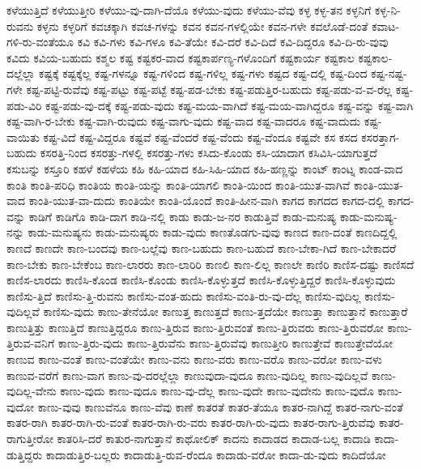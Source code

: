 {ಕಳೆಯುತ್ತಿದೆ
ಕಳೆಯುತ್ತೀರಿ
ಕಳೆಯು-ವು-ದಾಗಿ-ದೆಯೊ
ಕಳೆಯು-ವುದು
ಕಳೆಯು-ವೆವು
ಕಳ್ಳ
ಕಳ್ಳ-ತನ
ಕಳ್ಳನಿಗೆ
ಕಳ್ಳ-ನಿ-ರುವನು
ಕಳ್ಳನು
ಕಳ್ಳರಿಗೆ
ಕವಚಕ್ಕಾಗಿ
ಕವಚ-ಗಳನ್ನು
ಕವನ
ಕವನ-ಗಳಲ್ಲಿಯೇ
ಕವನ-ಗಳೇ
ಕವಲೊಡೆ-ದಂತೆ
ಕವಾಟ-ಗಳಿ-ರು-ವಂತೆಯೂ
ಕವಿ
ಕವಿ-ಗಳು
ಕವಿ-ಗಳೂ
ಕವಿ-ತೆಯೇ
ಕವಿ-ದರೆ
ಕವಿ-ದಿದೆ
ಕವಿ-ದಿದ್ದರೂ
ಕವಿ-ದಿ-ರು-ವುವು
ಕವಿದು
ಕವಿಯ-ಬಹುದು
ಕಶ್ಮಲ
ಕಷ್ಟ
ಕಷ್ಟಕರ-ವಾದ
ಕಷ್ಟಕಾರ್ಪಣ್ಯ-ಗಳೊಂದಿಗೆ
ಕಷ್ಟಕಾರ್ಯ
ಕಷ್ಟಕಾಲ
ಕಷ್ಟಕಾಲ-ದಲ್ಲೆಲ್ಲಾ
ಕಷ್ಟಕ್ಕೆ
ಕಷ್ಟಕ್ಕೆಲ್ಲ
ಕಷ್ಟ-ಗಳನ್ನೂ
ಕಷ್ಟ-ಗಳಿಂದ
ಕಷ್ಟ-ಗಳಿಲ್ಲ
ಕಷ್ಟ-ಗಳು
ಕಷ್ಟದ
ಕಷ್ಟ-ದಲ್ಲಿ
ಕಷ್ಟ-ದಿಂದ
ಕಷ್ಟ-ನಷ್ಟ-ಗಳೇ
ಕಷ್ಟ-ಪಟ್ಟಿ-ರುವೆವು
ಕಷ್ಟ-ಪಟ್ಟು
ಕಷ್ಟ-ಪಟ್ಟೆ
ಕಷ್ಟ-ಪಡ-ಬೇಕು
ಕಷ್ಟ-ಪಡುತ್ತಿರ-ಬಹುದು
ಕಷ್ಟ-ಪಡು-ವ-ವ-ರೆಲ್ಲ
ಕಷ್ಟ-ಪಡು-ವಿರಿ
ಕಷ್ಟ-ಪಡು-ವು-ದಕ್ಕೆ
ಕಷ್ಟ-ಪಡು-ವುದು
ಕಷ್ಟ-ಮಯ-ವಾಗಿದೆ
ಕಷ್ಟ-ಮಯ-ವಾಗಿದ್ದರೂ
ಕಷ್ಟ-ವನ್ನು
ಕಷ್ಟ-ವಾಗಿ
ಕಷ್ಟ-ವಾಗಿ-ರ-ಬೇಕು
ಕಷ್ಟ-ವಾಗಿ-ರುವುದು
ಕಷ್ಟ-ವಾಗು-ವುದು
ಕಷ್ಟ-ವಾದ
ಕಷ್ಟ-ವಾದರೂ
ಕಷ್ಟ-ವಾದುದು
ಕಷ್ಟ-ವಾಯಿತು
ಕಷ್ಟ-ವಿದೆ
ಕಷ್ಟ-ವಿದ್ದರೂ
ಕಷ್ಟವೆ
ಕಷ್ಟ-ವೆಂದರೆ
ಕಷ್ಟ-ವೆಂದು
ಕಷ್ಟ-ವೆಂದೂ
ಕಷ್ಟವೇ
ಕಸ
ಕಸದ
ಕಸರತ್ತಾಗ-ಬಹುದು
ಕಸರತ್ತಿ-ನಿಂದ
ಕಸರತ್ತು-ಗಳಲ್ಲಿ
ಕಸರತ್ತು-ಗಳು
ಕಸಿದು-ಕೊಂಡು
ಕಸಿ-ಯಾದಾಗ
ಕಸಿವಿಸಿ-ಯಾಗುತ್ತದೆ
ಕಸುಬನ್ನು
ಕಸ್ತೂರಿ
ಕಹಳೆ
ಕಹಳೆಯ
ಕಹಿ
ಕಹಿ-ಯಾದ
ಕಹಿ-ಸಿಹಿ-ಯಾದ
ಕಹಿ-ಹಣ್ಣನ್ನು
ಕಾಂಟ್
ಕಾಂಟ್ನ
ಕಾಂಡ-ವಾದ
ಕಾಂತಿ
ಕಾಂತಿ-ಪರಿಧಿ
ಕಾಂತಿಯ
ಕಾಂತಿ-ಯನ್ನು
ಕಾಂತಿ-ಯಾಗಲಿ
ಕಾಂತಿ-ಯಿಂದ
ಕಾಂತಿ-ಯುತ-ವಾಗಿವೆ
ಕಾಂತಿ-ಯುತ-ವಾದ
ಕಾಂತಿ-ಯುತ-ವಾ-ದುದು
ಕಾಂತಿಯೇ
ಕಾಂತಿ-ಯೊಂದೆ
ಕಾಂತಿ-ಹೀನ-ವಾಗಿ
ಕಾಗದ
ಕಾಗದದ
ಕಾಗದ-ದಲ್ಲಿ
ಕಾಗದ-ವನ್ನು
ಕಾಡಿಗೆ
ಕಾಡಿಗೊ
ಕಾಡಿ-ದಾಗ
ಕಾಡಿ-ನಲ್ಲಿ
ಕಾಡು
ಕಾಡು-ಜ-ನರ
ಕಾಡುತ್ತಿವೆ
ಕಾಡು-ಮನುಷ್ಯ
ಕಾಡು-ಮನುಷ್ಯ-ನನ್ನು
ಕಾಡು-ಮನುಷ್ಯನು
ಕಾಡು-ಮನುಷ್ಯರು
ಕಾಡು-ವುದು
ಕಾಣತೊಡಗು-ವುವು
ಕಾಣದ
ಕಾಣ-ದಂತೆ
ಕಾಣದಿದ್ದಲ್ಲಿ
ಕಾಣದೆ
ಕಾಣದೇ
ಕಾಣ-ಬಂದವು
ಕಾಣ-ಬಲ್ಲೆವು
ಕಾಣ-ಬಹುದು
ಕಾಣ-ಬಹುದೆ
ಕಾಣ-ಬೇಕಾ-ಗಿದೆ
ಕಾಣ-ಬೇಕಾದರೆ
ಕಾಣ-ಬೇಕು
ಕಾಣ-ಬೇಕೆಂಬ
ಕಾಣ-ಲಾರರು
ಕಾಣ-ಲಾರಿರಿ
ಕಾಣಲಿ
ಕಾಣ-ಲಿಲ್ಲ
ಕಾಣಲೇ
ಕಾಣಿರಿ
ಕಾಣಿಸ-ದಷ್ಟು
ಕಾಣಿಸದೆ
ಕಾಣಿಸ-ಲಾರದು
ಕಾಣಿಸಿ-ಕೊಂಡ
ಕಾಣಿಸಿ-ಕೊಂಡು
ಕಾಣಿಸಿ-ಕೊಳ್ಳುತ್ತದೆ
ಕಾಣಿಸಿ-ಕೊಳ್ಳುತ್ತಿದ್ದರೆ
ಕಾಣಿಸಿ-ಕೊಳ್ಳುವುದು
ಕಾಣಿಸು-ತ್ತಿದೆ
ಕಾಣಿಸು-ತ್ತಿ-ರುವನು
ಕಾಣಿಸು-ವಂತ-ಹುದು
ಕಾಣಿಸು-ವಂತಿ-ರು-ವು-ದೆಲ್ಲ
ಕಾಣಿಸು-ವುದಿಲ್ಲ
ಕಾಣಿಸು-ವುದಿಲ್ಲವೆ
ಕಾಣಿಸು-ವುದು
ಕಾಣು-ತೇನೆಯೋ
ಕಾಣುತ್ತ
ಕಾಣುತ್ತದೆ
ಕಾಣು-ತ್ತದೆಯೇ
ಕಾಣುತ್ತಾ
ಕಾಣುತ್ತಾನೆ
ಕಾಣುತ್ತಾರೆ
ಕಾಣುತ್ತಿತ್ತು
ಕಾಣುತ್ತಿದೆ
ಕಾಣುತ್ತಿದ್ದರೂ
ಕಾಣು-ತ್ತಿರುವ
ಕಾಣು-ತ್ತಿರುವಂತೆ
ಕಾಣು-ತ್ತಿರುವರು
ಕಾಣು-ತ್ತಿರುವರೋ
ಕಾಣು-ತ್ತಿರುವ-ವನಿಗೆ
ಕಾಣು-ತ್ತಿರು-ವುದು
ಕಾಣು-ತ್ತಿರುವೆನು
ಕಾಣು-ತ್ತಿರುವೆವು
ಕಾಣುತ್ತೀರಿ
ಕಾಣುತ್ತೇವೆ
ಕಾಣುತ್ತೇವೆಯೋ
ಕಾಣುವ
ಕಾಣು-ವಂತೆ
ಕಾಣು-ವಂತೆಯೇ
ಕಾಣು-ವನು
ಕಾಣು-ವರು
ಕಾಣು-ವರೊ
ಕಾಣು-ವರೋ
ಕಾಣು-ವಳು
ಕಾಣುವ-ವರೆಗೆ
ಕಾಣು-ವಾಗ
ಕಾಣು-ವು-ದರಲ್ಲೆಲ್ಲಾ
ಕಾಣುವುದಾ-ವುದೂ
ಕಾಣು-ವುದಿಲ್ಲ
ಕಾಣು-ವುದಿಲ್ಲವೆ
ಕಾಣು-ವುದಿಲ್ಲ-ವೇನು
ಕಾಣು-ವುದು
ಕಾಣು-ವುದೂ
ಕಾಣು-ವು-ದೆಲ್ಲ
ಕಾಣು-ವುದೇ
ಕಾಣು-ವುದೇನು
ಕಾಣು-ವುದೊ
ಕಾಣು-ವುದೋ
ಕಾಣು-ವುವು
ಕಾಣುವೆನೂ
ಕಾಣು-ವೆವು
ಕಾಣೆ
ಕಾತರತೆ
ಕಾತರ-ತೆಯೂ
ಕಾತರ-ನಾಗಿದ್ದೆ
ಕಾತರ-ನಾಗು-ವಂತೆ
ಕಾತರ-ರಾಗಿ
ಕಾತರ-ರಾಗಿ-ರು-ವಂತೆ
ಕಾತರ-ರಾಗಿ-ರು-ವರು
ಕಾತರ-ರಾಗಿ-ರು-ವುದು
ಕಾತರ-ರಾಗು-ತ್ತಿರುವೆವು
ಕಾತರ-ರಾಗುತ್ತೀರೋ
ಕಾತರಿಸಿ-ದರೆ
ಕಾತುರ-ನಾಗುತ್ತಾನೆ
ಕಾಥೋಲಿಕ್
ಕಾದನು
ಕಾದಾಡದ
ಕಾದಾಡ-ಬಲ್ಲ
ಕಾದಾಡಿ
ಕಾದಾ-ಡುತ್ತಿದ್ದರು
ಕಾದಾಡುತ್ತಿರ-ಬಲ್ಲರು
ಕಾದಾಡುತ್ತಿ-ರುವ-ರೆಂದೂ
ಕಾದಾಡು-ವರೋ
ಕಾದಾ-ಡು-ವುದು
ಕಾದಿದೆಯೋ
}
